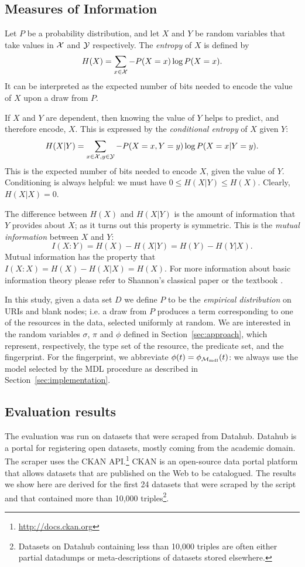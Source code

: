 \subsection{Measures of Information}

Let $P$ be a probability distribution, and let $X$ and $Y$ be random
variables that take values in ${\mathcal X}$ and ${\mathcal Y}$ respectively. The
\emph{entropy} of $X$ is defined by
\[H(X)=\sum_{x\in{\mathcal X}}-P(X=x)\log P(X=x).\]
It can be interpreted as the expected number of bits needed to encode
the value of $X$ upon a draw from $P$.

If $X$ and $Y$ are dependent, then knowing the value of $Y$ helps to
predict, and therefore encode, $X$. This is expressed by the
\emph{conditional entropy} of $X$ given $Y$:
\[H(X|Y)=\sum_{x\in{\mathcal X},y\in{\mathcal Y}}-P(X=x,Y=y)\log
P(X=x|Y=y).\]
This is the expected number of bits needed to encode $X$, given
the value of $Y$. Conditioning is always helpful: we must have $0\le
H(X|Y)\le H(X)$. Clearly, $H(X|X)=0$.

The difference between $H(X)$ and $H(X|Y)$ is the amount of
information that $Y$ provides about $X$; as it turns out this property
is symmetric. This is the \emph{mutual information} between $X$ and $Y$:
\[I(X:Y)=H(X)-H(X|Y)=H(Y)-H(Y|X).\]
Mutual information has the property that
$I(X:X)=H(X)-H(X|X)=H(X)$. For more information about basic
information theory please refer to Shannon's classical paper
\cite{Shannon1948} or the textbook \cite{cover1991}.

In this study, given a data set $D$ we define $P$ to be the
\emph{empirical distribution} on URIs and blank nodes; i.e. a draw
from $P$ produces a term corresponding to one of the resources in the
data, selected uniformly at random. We are interested in the random
variables $\sigma$, $\pi$ and $\phi$ defined in
Section~\ref{sec:approach}, which represent, respectively, the type set
of the resource, the predicate set, and the fingerprint. For the
fingerprint, we abbreviate $\phi(t)=\phi_{{\mathcal M}_\textnormal{mdl}}(t)$: we always
use the model selected by the MDL procedure as described in
Section~\ref{sec:implementation}.

\subsection{Evaluation results}

The evaluation was run on datasets that were scraped from Datahub.
Datahub is a portal for registering open datasets,
 mostly coming from the academic domain.
The scraper uses the CKAN API.\footnote{\url{http://docs.ckan.org}}
CKAN is an open-source data portal platform
 that allows datasets that are published on the Web to be catalogued.
The results we show here are derived for the first 24 datasets
 that were scraped by the script and that contained
 more than 10,000 triples\footnote{
  Datasets on Datahub containing less than 10,000 triples
  are often either partial datadumps or meta-descriptions of datasets
  stored elsewhere.
 }.

